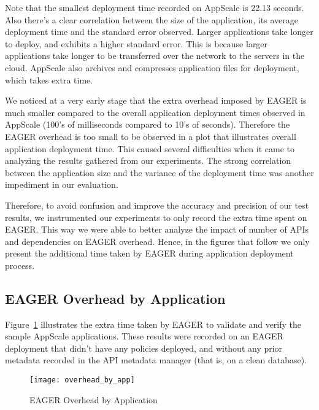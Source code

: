 Note that the smallest deployment time recorded on AppScale is 22.13 seconds. Also there's a clear correlation between the
size of the application, its average deployment time and the standard error observed. Larger applications take longer to deploy,
and exhibits a higher standard error. This is because larger applications take longer to be transferred over the network to the 
servers in the cloud. AppScale also archives and compresses application files for deployment, which takes extra
time.

We noticed at a very early stage that the extra overhead imposed by EAGER is much smaller compared to the overall application
deployment times observed in AppScale (100's of milliseconds compared to 10's of seconds). Therefore the EAGER overhead
is too small to be observed in a plot that illustrates overall application deployment time. This caused several difficulties when it
came to analyzing the results gathered from our experiments. The strong correlation between the
application size and the variance of the deployment time was another impediment in our evaluation.

Therefore, to avoid confusion and improve the accuracy and precision of our test results, we instrumented our experiments to
only record the extra time spent on EAGER. This way we were able to better analyze the impact of number of APIs and dependencies
on EAGER overhead. Hence, in the figures that follow we only present the additional time taken by EAGER during application
deployment process.

\subsection{EAGER Overhead by Application}

Figure~\ref{fig:overhead_by_app} illustrates the extra time taken by EAGER to validate and verify the sample AppScale applications.
These results were recorded on an EAGER deployment that didn't have any policies deployed, and without any prior
metadata recorded in the API metadata manager (that is, on a clean database).

\begin{figure}
\centering
\texttt{[image: overhead\_by\_app]}
\caption{EAGER Overhead by Application}
\label{fig:overhead_by_app}
\end{figure}

